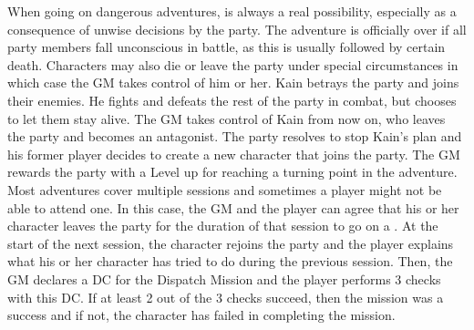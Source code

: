 When going on dangerous adventures,  is always a real possibility, especially as a consequence of unwise decisions by the party. 
The adventure is officially over if all party members fall unconscious in battle, as this is usually followed by certain death. 
Characters may also die or leave the party under special circumstances in which case the GM takes control of him or her.
%
\ofpar
%
{
	Kain betrays the party and joins their enemies. 
	He fights and defeats the rest of the party in combat, but chooses to let them stay alive.
	The GM takes control of Kain from now on, who leaves the party and becomes an antagonist.
	The party resolves to stop Kain's plan and his former player decides to create a new character that joins the party. 
	The GM rewards the party with a Level up for reaching a turning point in the adventure.
}
%
\vfill
%
Most adventures cover multiple sessions and sometimes a player might not be able to attend one.
In this case, the GM and the player can agree that his or her character leaves the party for the duration of that session to go on a .
At the start of the next session, the character rejoins the party and the player explains what his or her character has tried to do during the previous session.
Then, the GM declares a DC for the Dispatch Mission and the player performs 3 checks with this DC.
If at least 2 out of the 3 checks succeed, then the mission was a success and if not, the character has failed in completing the mission.
%
\clearpage